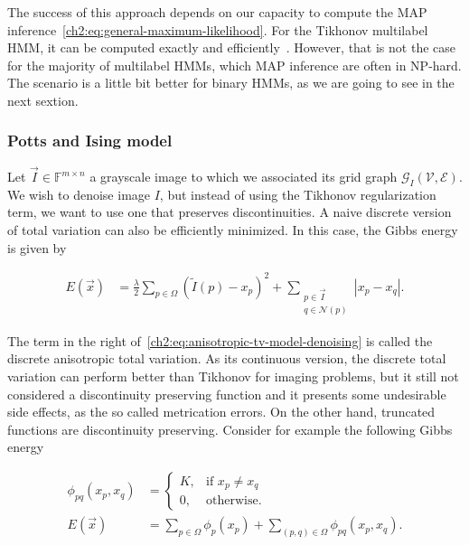 

The success of this approach depends on our capacity to compute the MAP inference~\cref{ch2:eq:general-maximum-likelihood}. For the Tikhonov multilabel HMM, it can be computed exactly and efficiently~\cite{ishikawa03}. However, that is not the case for the majority of multilabel HMMs, which MAP inference are often in NP-hard. The scenario is a little bit better for binary HMMs, as we are going to see in the next sextion.

\subsubsection{Potts and Ising model}

Let $\vec{I} \in \mathbb{F}^{m \times n}$ a grayscale image to which we associated its grid graph $\mathcal{G}_I(\mathcal{V},\mathcal{E})$. We wish to denoise image $I$, but instead of using the Tikhonov regularization term, we want to use one that preserves discontinuities. A naive discrete version of total variation can also be efficiently minimized. In this case, the Gibbs energy is given by

\begin{align}
	E(\vec{x}) &= \frac{\lambda}{2}\sum_{p \in \Omega }{ (\widetilde{I}(p) - x_p)^2} + \sum_{ \substack{ p \in \vec{I} \\ q \in \mathcal{N}(p) }}{ | x_p - x_q | }.	
	\label{ch2:eq:anisotropic-tv-model-denoising}
\end{align}

The term in the right of~\cref{ch2:eq:anisotropic-tv-model-denoising} is called the discrete anisotropic total variation. As its continuous version, the discrete total variation can perform better than Tikhonov for imaging problems, but it still not considered a discontinuity preserving function and it presents some undesirable side effects, as the so called metrication errors. On the other hand, truncated functions are discontinuity preserving. Consider for example the following Gibbs energy

\begin{align}
	\phi_{pq}(x_p,x_q) &= \left\{ \begin{array}{rl}
		K,& \text{if } x_p \neq x_q \\
		0,& \text{otherwise}.
	\end{array}\right. \label{ch2:eq:potts-model-denoising-1} \\[1em]
	E(\vec{x}) &= \sum_{p \in \Omega }{\phi_p(x_p)} + \sum_{(p,q) \in \Omega}{\phi_{pq}(x_p,x_q)}.	
	\label{ch2:eq:potts-model-denoising-2}
\end{align}


